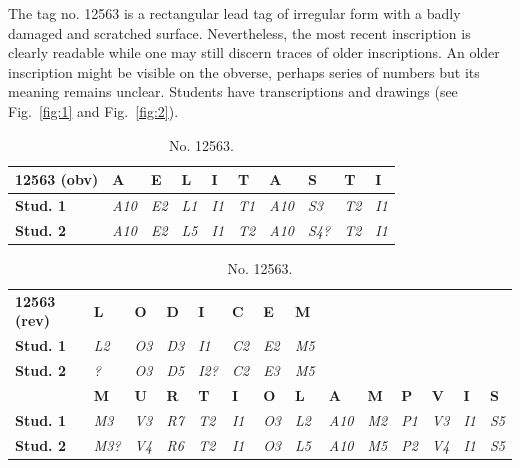 \documentclass[amsthm,ebook]{saparticle}
\begin{document}
\vspace{0,3cm}

The tag no. 12563 is a rectangular lead tag of irregular form with a badly damaged and scratched surface. Nevertheless, the most
recent inscription is clearly readable while one may still discern traces of older inscriptions. An older inscription
might be visible on the obverse, perhaps series of numbers but its meaning remains unclear. Students have
transcriptions and drawings (see Fig.~\ref{fig:1} and Fig.~\ref{fig:2}).


\begin{table}[!hbp]
{\small
\addtolength{\tabcolsep}{-0.7mm}
\begin{tabular*}{\textwidth}{llllllllll}
\toprule
\textbf{12563 (obv)} & \textbf{A} & \textbf{E} & \textbf{L} & \textbf{I} & \textbf{T} & \textbf{A} & \textbf{S} & \textbf{T} & \textbf{I}\\
\midrule
\textbf{Stud. 1} & \textit{A10} & \textit{E2} & \textit{L1} & \textit{I1} & \textit{T1} & \textit{A10} & \textit{S3} & \textit{T2} & \textit{I1} \\
\textbf{Stud. 2} & \textit{A10} & \textit{E2} & \textit{L5} & \textit{I1} & \textit{T2} & \textit{A10} & \textit{S4?} & \textit{T2} & \textit{I1}  \\
\bottomrule
\end{tabular*}

\begin{tabular*}{\textwidth}{llllllllllllll}
 & & & & & & & & & & & & & \\
\toprule
\textbf{12563 (rev)} & \textbf{L} & \textbf{O} & \textbf{D} & \textbf{I} & \textbf{C} & \textbf{E} & \textbf{M} & & & & & &\\
\midrule
\textbf{Stud. 1} & \textit{L2} & \textit{O3} & \textit{D3} & \textit{I1} & \textit{C2} & \textit{E2} & \textit{M5} &  &  & & & & \\
\textbf{Stud. 2} & \textit{?} & \textit{O3} & \textit{D5} & \textit{I2?} & \textit{C2} & \textit{E3} & \textit{M5} & & & & & &  \\
\midrule
 & \textbf{M} & \textbf{U} & \textbf{R} & \textbf{T} & \textbf{I} & \textbf{O} & \textbf{L} & \textbf{A} & \textbf{M} & \textbf{P} & \textbf{V} & \textbf{I} & \textbf{S}\\
 \midrule
\textbf{Stud. 1}& \textit{M3} & \textit{V3} & \textit{R7} & \textit{T2} & \textit{I1} & \textit{O3} & \textit{L2} & \textit{A10} & \textit{M2} & \textit{P1} & \textit{V3} & \textit{I1} & \textit{S5} \\
\textbf{Stud. 2} & \textit{M3?} & \textit{V4} & \textit{R6} & \textit{T2} & \textit{I1} & \textit{O3} & \textit{L5} & \textit{A10} & \textit{M5} & \textit{P2} & \textit{V4} & \textit{I1} & \textit{S5} \\
\bottomrule
\end{tabular*}}

\caption{No. 12563.}
\label{tab:table1}
\end{table}
\end{document}
